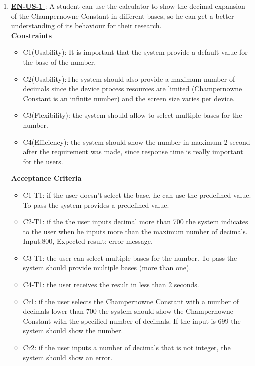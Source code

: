 \documentclass{report}
\begin{document}
\begin{enumerate}
    \item \underline{\textbf{EN-US-1 }}: A student can use the calculator to show the decimal expansion of the Champernowne Constant in different bases, so he can get a better understanding of its behaviour for their research. \\ \newline
\textbf{Constraints}
\begin{itemize}
    \item C1(Usability): It is important that the system provide a default value for the base of the number.
    \item C2(Usability):The system should also provide a maximum number of decimals since the device process resources are limited (Champernowne Constant is an infinite number) and the screen size varies per device. 
    \item C3(Flexibility): the system should allow to select multiple bases for the number. 
    \item C4(Efficiency): the system should show the number in maximum 2 second after the requirement was made, since response time is really important for the users.
\end{itemize}

\textbf{Acceptance Criteria}
\begin{itemize}
    \item C1-T1: if the user doesn't select the base, he can use the predefined value. To pass the system provides a predefined value. 
    \item C2-T1: if the the user inputs decimal more than 700 the system indicates to the user when he inputs more than the maximum number of decimals. Input:800, Expected result: error message.
    \item C3-T1: the user can select multiple bases for the number. To pass the system should provide multiple bases (more than one).
    \item C4-T1: the user receives the result in less than 2 seconds.
    
    \item Cr1: if the user selects the Champernowne Constant with a number of decimals lower than 700 the system should show the Champernowne Constant with the specified number of decimals. If the input is 699 the system should show the number. 
    \item Cr2: if the user inputs a number of decimals that is not integer, the system should show an error. 
   

\end{itemize}
\end{enumerate}
\end{document}
